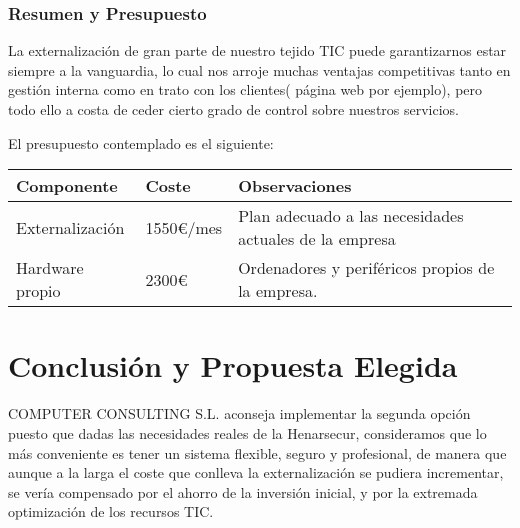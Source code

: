 \documentclass[12pt,letterpaper]{article}
\begin{document}
	\subsubsection{Resumen y Presupuesto}
	La externalización de gran parte de nuestro tejido TIC puede garantizarnos estar siempre a la vanguardia, lo cual nos arroje muchas ventajas competitivas tanto en gestión interna como en trato con los clientes( página web por ejemplo), pero todo ello a costa de ceder cierto grado de control sobre nuestros servicios.\par
	El presupuesto contemplado es el siguiente:
	\begin{center}
    \begin{tabular}{ | l | l | p{7cm} |}
    \hline
    Componente & Coste & Observaciones \\ \hline
    Externalización & 1550€/mes & Plan adecuado a las necesidades actuales de la empresa \\ \hline
    Hardware propio & 2300€ & Ordenadores y periféricos propios de la empresa. \\ \hline
    \end{tabular}
	\end{center}
	
	\section{Conclusión y Propuesta Elegida}
	COMPUTER CONSULTING S.L. aconseja implementar la segunda opción puesto que dadas las necesidades reales de la Henarsecur, consideramos que lo más conveniente es tener un sistema flexible, seguro y profesional, de manera que aunque a la larga el coste que conlleva la externalización se pudiera incrementar, se vería compensado por el ahorro de la inversión inicial, y por la extremada optimización de los recursos TIC.
\end{document}
